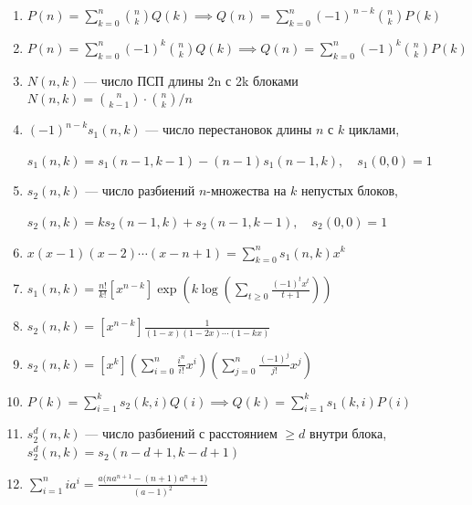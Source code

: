 \begin{enumerate}
\item %
$P(n)=\sum_{k=0}^{n}\binom{n}{k}Q(k) \implies Q(n)=\sum_{k=0}^{n}(-1)^{\,n-k}\binom{n}{k}P(k)$

\item %
$P(n)=\sum_{k=0}^{n}(-1)^k\binom{n}{k}Q(k) \implies Q(n)=\sum_{k=0}^{n}(-1)^k\binom{n}{k}P(k)$

\item %
$N(n, k)$ — число ПСП длины 2n с 2k блоками
$N(n,k) = \binom{n}{k-1} \cdot \binom{n}{k} / n$

\item %
$(-1)^{n-k}s_1(n,k)$ — число перестановок длины $n$ с $k$ циклами,

$s_1(n,k)=s_1(n-1,k-1)-(n-1)s_1(n-1,k),\quad s_1(0,0)=1$

\item %
$s_2(n,k)$ — число разбиений $n$-множества на $k$ непустых блоков,

$s_2(n,k)=ks_2(n-1,k)+s_2(n-1,k-1),\quad s_2(0,0)=1$

\item %
$x(x-1)(x-2)\cdots(x-n+1)=\sum_{k=0}^{n}s_1(n,k)x^k$

\item %
$s_1(n,k)=\frac{n!}{k!}[x^{n-k}]
\exp\left(k\log\left(\sum_{t\ge0}\frac{(-1)^t x^t}{t+1}\right)\right)$

\item %
$s_2(n,k)=[x^{n-k}]
\frac{1}{(1-x)(1-2x)\cdots(1-kx)}$

\item %
$s_2(n,k)=[x^k]\left(\sum_{i=0}^{n}\frac{i^n}{i!}x^i\right)
\left(\sum_{j=0}^{n}\frac{(-1)^j}{j!}x^j\right)$

\item %
$P(k)=\sum_{i=1}^{k}s_2(k,i)Q(i)
\implies Q(k)=\sum_{i=1}^{k}s_1(k,i)P(i)$

\item %
$s_2^d(n,k)$ — число разбиений с расстоянием $\ge d$ внутри блока,
$s_2^d(n,k)=s_2(n-d+1,k-d+1)$

\item %
$\sum_{i=1}^n i a^i=\frac{a\bigl(n a^{n+1}-(n+1)a^n+1\bigr)}{(a-1)^2}$


\end{enumerate}
